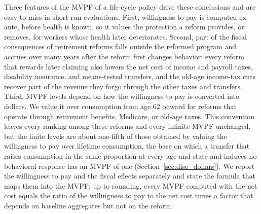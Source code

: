 Three features of the MVPF of a life-cycle policy drive these conclusions and are easy to miss in short-run evaluations. First, willingness to pay is computed ex ante, before health is known, so it values the protection a reform provides, or removes, for workers whose health later deteriorates. Second, part of the fiscal consequences of retirement reforms falls outside the reformed program and accrues over many years after the reform first changes behavior: every reform that rewards later claiming also lowers the net cost of income and payroll taxes, disability insurance, and means-tested transfers, and the old-age income-tax cuts recover part of the revenue they forgo through the other taxes and transfers. Third, MVPF levels depend on how the willingness to pay is converted into dollars. We value it over consumption from age 62 onward for reforms that operate through retirement benefits, Medicare, or old-age taxes. This convention leaves every ranking among these reforms and every infinite MVPF unchanged, but the finite levels are about one-fifth of those obtained by valuing the willingness to pay over lifetime consumption, the base on which a transfer that raises consumption in the same proportion at every age and state and induces no behavioral response has an MVPF of one (Section~\ref{sec:disc_dollars}). We report the willingness to pay and the fiscal effects separately and state the formula that maps them into the MVPF; up to rounding, every MVPF computed with the net cost equals the ratio of the willingness to pay to the net cost times a factor that depends on baseline aggregates but not on the reform.

